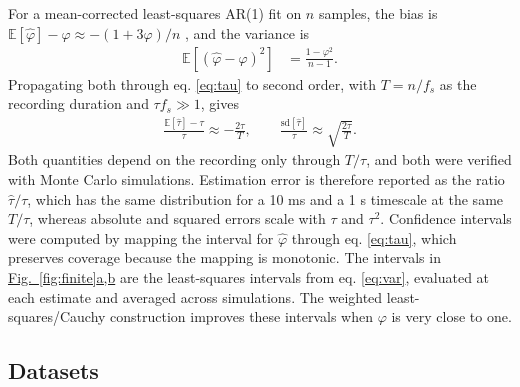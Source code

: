 \documentclass[pdflatex,lineno,sn-nature]{sn-jnl}
\newcommand{\figpanel}[3][]{\hyperref[#2]{Fig.~#1\ref*{#2}#3}}
\theoremstyle{thmstyleone}
\theoremstyle{thmstyletwo}
\theoremstyle{thmstylethree}
\begin{document}
For a mean-corrected least-squares AR(1) fit on $n$ samples, the bias is $\mathbb{E}[\hat\varphi] - \varphi \approx -(1+3\varphi)/n$ \cite{marriott_bias_1954, kendall_note_1954}, and the variance is
\begin{align}
\mathbb{E}[ (\hat{\varphi} - \varphi)^2 ] &= \frac{1 - \varphi^2}{n-1}. \label{eq:var}
\end{align}
Propagating both through eq. \ref{eq:tau} to second order, with $T = n/f_s$ as the recording duration and $\tau f_s \gg 1$, gives
\begin{align}
\frac{\mathbb{E}[\hat\tau] - \tau}{\tau} \approx -\frac{2\tau}{T}, \qquad
\frac{\mathrm{sd}[\hat\tau]}{\tau} \approx \sqrt{\frac{2\tau}{T}}. \label{eq:finite}
\end{align}
Both quantities depend on the recording only through $T/\tau$, and both were verified with Monte Carlo simulations. Estimation error is therefore reported as the ratio $\hat\tau/\tau$, which has the same distribution for a 10 ms and a 1 s timescale at the same $T/\tau$, whereas absolute and squared errors scale with $\tau$ and $\tau^2$. Confidence intervals were computed by mapping the interval for $\hat\varphi$ through eq. \ref{eq:tau}, which preserves coverage because the mapping is monotonic. The intervals in \figpanel{fig:finite}{a,b} are the least-squares intervals from eq. \ref{eq:var}, evaluated at each estimate and averaged across simulations. The weighted least-squares/Cauchy construction \cite{gallagher_small_2008} improves these intervals when $\varphi$ is very close to one.

\subsection{Datasets}
\end{document}
